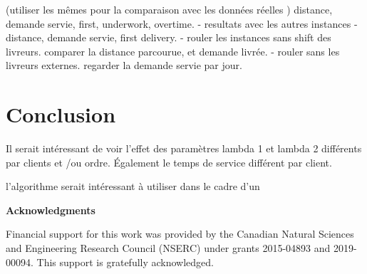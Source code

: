 \documentclass{article}
\begin{document}
(utiliser les mêmes pour la comparaison avec les données réelles )
distance, demande servie, first, underwork, overtime.
- resultats avec les autres instances
- distance, demande servie, first delivery.
- rouler les instances sans shift des livreurs. comparer la distance parcourue, et demande livrée.
- rouler sans les livreurs externes. regarder la demande servie par jour.

\section{Conclusion}
\label{concl}

Il serait intéressant de voir l'effet des paramètres lambda 1 et lambda 2 différents par clients et /ou ordre. Également le temps de service différent par client.

l'algorithme serait intéressant à utiliser dans le cadre d'un


\vspace{0.1in}


\vspace{1.5cm} \noindent \textbf{Acknowledgments}

Financial support for this work was provided by the Canadian Natural Sciences and Engineering Research Council (NSERC) under grants 2015-04893 and 2019-00094. This support is gratefully acknowledged.




\end{document}
